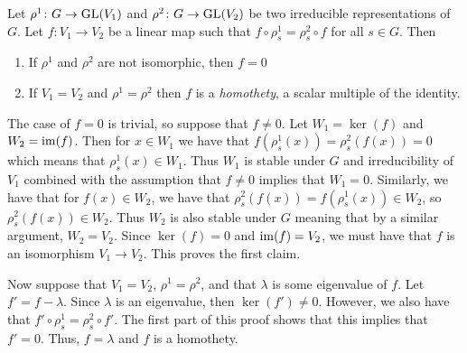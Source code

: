 \documentclass[letterpaper, 11pt, oneside]{book}
\begin{document}
\begin{prop}\label{prop:schurs_lemma}
  Let $\rho^{1}\colon G \to \operatorname{GL}(V_{1})$ and $\rho^{2}\colon G \to \operatorname{GL}(V_{2})$ be two irreducible representations of $G$.
  Let $f\colon V_{1} \to V_{2}$ be a linear map such that $f \circ \rho_{s}^{1} = \rho_{s}^{2} \circ f$ for all $s \in G$.
  Then
  \begin{enumerate}
  \item If $\rho^{1}$ and $\rho^{2}$ are not isomorphic, then $f = 0$
  \item If $V_{1} = V_{2}$ and $\rho^{1} = \rho^{2}$ then $f$ is a \emph{homothety}, a scalar multiple of the identity.
  \end{enumerate}
\end{prop}
\begin{pf}
  The case of $f = 0$ is trivial, so suppose that $f \neq 0$.
  Let $W_{1} = \ker(f)$ and $W_{2} = \operatorname{im}(f)$.
  Then for $x \in W_{1}$ we have that $f(\rho_{s}^{1}(x)) = \rho_{s}^{2}(f(x)) = 0$ which means that $\rho_{s}^{1}(x) \in W_{1}$.
  Thus $W_{1}$ is stable under $G$ and irreducibility of $V_{1}$ combined with the assumption that $f \neq 0$ implies that $W_{1} = 0$.
  Similarly, we have that for $f(x) \in W_{2}$, we have that $\rho_{s}^{2}(f(x)) = f(\rho_{s}^{1}(x)) \in W_{2}$, so $\rho_{s}^{2}(f(x)) \in W_{2}$.
  Thus $W_{2}$ is also stable under $G$ meaning that by a similar argument, $W_{2} = V_{2}$.
  Since $\ker(f) = 0$ and $\operatorname{im}(f) = V_{2}$, we must have that $f$ is an isomorphism $V_{1} \to V_{2}$.
  This proves the first claim.

  Now suppose that $V_{1} = V_{2}$, $\rho^{1} = \rho^{2}$, and that $\lambda$ is some eigenvalue of $f$.
  Let $f' = f - \lambda$.
  Since $\lambda$ is an eigenvalue, then $\ker(f') \neq 0$.
  However, we also have that $f' \circ \rho_{s}^{1} = \rho_{s}^{2} \circ f'$.
  The first part of this proof shows that this implies that $f' = 0$.
  Thus, $f = \lambda$ and $f$ is a homothety.
\end{pf}
\end{document}
